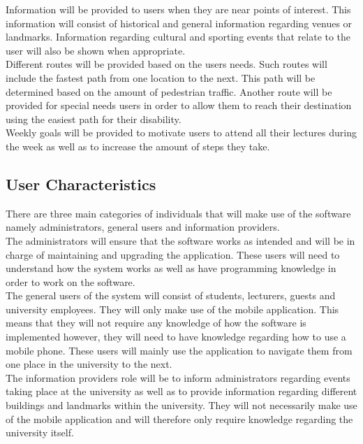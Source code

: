 \documentclass[11pt,a4paper]{article}
\begin{document}
	Information will be provided to users when they are near points of interest. This information will consist of historical and general information regarding venues or landmarks. Information regarding cultural and sporting events that relate to the user will also be shown when appropriate.
	\\

	Different routes will be provided based on the users needs. Such routes will include the fastest path from one location to the next. This path will be determined based on the amount of pedestrian traffic. Another route will be provided for special needs users in order to allow them to reach their destination using the easiest path for their disability.
	\\

	Weekly goals will be provided to motivate users to attend all their lectures during the week as well as to increase the amount of steps they take.

	\subsection{User Characteristics}
	There are three main categories of individuals that will make use of the software namely administrators, general users and information providers.
	\\


	The administrators will ensure that the software works as intended and will be in charge of maintaining and upgrading the application. These users will need to understand how the system works as well as have programming knowledge in order to work on the software.
	\\

	The general users of the system will consist of students, lecturers, guests and university employees. They will only make use of the mobile application. This means that they will not require any knowledge of how the software is implemented however, they will need to have knowledge regarding how to use a mobile phone. These users will mainly use the application to navigate them 		from one place in the university to the next.
	\\

	The information providers role will be to inform administrators regarding events taking place at the university as well as to provide information regarding different buildings and landmarks within the university. They will not necessarily make use of the mobile application and will therefore only require knowledge regarding the university itself.
\end{document}
